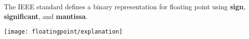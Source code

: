 \begin{blocksection}
The IEEE standard defines a binary representation for floating point using \textbf{sign}, \textbf{significant}, and \textbf{mantissa}.

\texttt{[image: floatingpoint/explanation]}

\end{blocksection}
